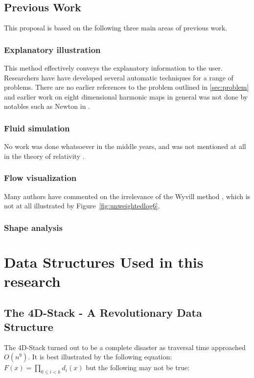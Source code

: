 \documentclass[11pt]{report}
\begin{document}
\section{Previous Work}

This proposal is based on the following three main areas of previous work.

\subsection{Explanatory illustration}

This method effectively conveys the explanatory information to the user. Researchers
have have developed several automatic techniques for a range of problems. \cite{Mitra2010}
There are no earlier references to the problem outlined in \ref{sec:problem} and earlier work on eight dimensional harmonic maps in general was not done by notables such as Newton in \cite{principia}.

\subsection{Fluid simulation}
No work was done whatsoever in the middle years, and was not mentioned at all in the theory of relativity \cite{einstein}.

\subsection{Flow visualization}
Many authors have commented on the irrelevance of the Wyvill method \cite{Wyvill:1999p149}, which
is not at all illustrated by Figure~\ref{fig:unweightedlog6}.

\subsection{Shape analysis}

\chapter{Data Structures Used in this research}
\section{The 4D-Stack - A Revolutionary Data Structure}
The 4D-Stack turned out to be a complete disaster as traversal time approached $O(n^9).$
It is best illustrated by the following equation: $F(x) = \prod_{0\leq i<k}d_i(x)$
but the following may not be true:
\end{document}
